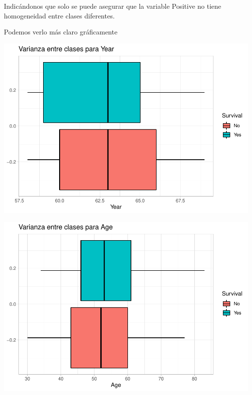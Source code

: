 \documentclass[
]{article}
\begin{document}
Indicándonos que solo se puede asegurar que la variable Positive no
tiene homogeneidad entre clases diferentes.

Podemos verlo más claro gráficamente

\begin{center}\includegraphics{Clasificacion_files/figure-latex/unnamed-chunk-19-1} \end{center}

\begin{center}\includegraphics{Clasificacion_files/figure-latex/unnamed-chunk-19-2} \end{center}
\end{document}
